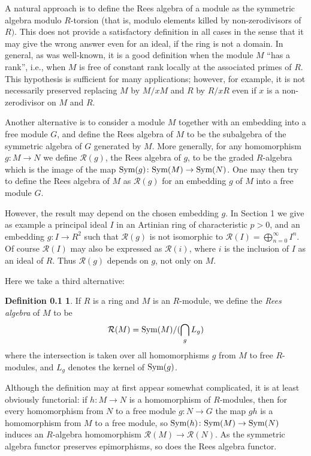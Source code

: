 \documentclass{proc-l}
\theoremstyle{plain}
\theoremstyle{definition}
\newtheorem*{definition1}{Definition 0.1}
\newcommand{\R}{\mathcal R}
\newcommand{\Sym}{\hbox {\rm Sym}}
\begin{document}
A natural approach is to define the Rees algebra of a module as
the symmetric algebra modulo  $R$-torsion (that is, modulo elements
killed by non-zerodivisors of $R)$. This does  not provide a
satisfactory definition in all cases in the sense that it may give
the wrong answer even for an ideal, if the ring is not a domain.
In general, as was well-known, it is a good definition when the
module $M$ ``has a rank'', i.e., when $M$ is free of constant rank
locally at the associated primes of $R$. This hypothesis is
sufficient for many applications; however, for example, it is not
necessarily preserved replacing $M$ by $M/xM$ and $R$ by $R/xR$
even if $x$ is a non-zerodivisor on $M$ and $R$.

Another alternative is to consider a module $M$ together with an
embedding into a free module $G$, and define the Rees algebra of
$M$ to be the subalgebra of the symmetric algebra of $G$ generated
by $M$. More generally, for any homomorphism $g \colon M\to N$ we
define $\R (g)$, the Rees algebra of $g$, to be the graded
$R$-algebra which is the image of the map $\Sym (g) \colon \Sym (M)\to \Sym (N)$. One may then try to define the Rees algebra
of $M$ as $\R (g)$ for an embedding $g$ of $M$ into a free module
$G$.

However, the result may depend on the chosen embedding  $g$. In Section 1 we
give as example a principal ideal $I$ in an Artinian ring of characteristic
$p>0$, and an embedding $g \colon I\to R^{2}$ such that $\R (g)$ is not
isomorphic to $\R (I)=\bigoplus _{n= 0}^{\infty }I^{n}$. Of course $\R (I)$ may
also be expressed as $\R (i)$, where $i$ is the inclusion of $I$ as an ideal of
$R$.  Thus $\R (g)$ depends on $g$, not only on $M$.

Here we take a third alternative:

\begin{definition1} If $R$ is a ring and $M$ is an
$R$-module, we define the {\em Rees algebra\/} of $M$ to be
\begin{equation*}\R (M)=\Sym (M)/(\bigcap _{g}L_{g})
\end{equation*}
where the intersection is taken over all homomorphisms $g$ from
$M$ to free $R$-modules, and $L_{g}$ denotes the kernel of
$\Sym (g)$.
\end{definition1}


Although the definition may at first appear somewhat complicated,
it is at least obviously functorial: if $h \colon M\to N$ is a
homomorphism of $R$-modules, then for every homomorphism from $N$
to a free module $g \colon N\to G$ the map $gh$ is a homomorphism
from $M$ to a free module, so $\Sym (h) \colon \Sym (M)\to \Sym (N)$
induces an $R$-algebra homomorphism $\R (M)\to \R (N)$.  As the
symmetric algebra functor preserves epimorphisms, so does the Rees
algebra functor.
\end{document}

